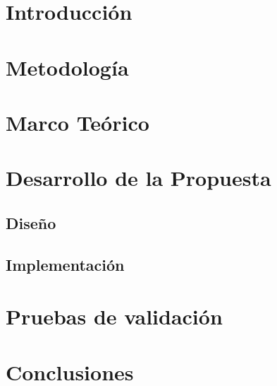 \documentclass[11pt,a4paper]{book}
\begin{document}
\tableofcontents

{\listoffigures \let\cleardoublepage\clearpage \listoftables}


\chapter{Introducción}


\chapter{Metodología}


\chapter{Marco Teórico}


\chapter{Desarrollo de la Propuesta}


%

\section{Diseño}


\section{Implementación}


\chapter{Pruebas de validación}


\chapter{Conclusiones}


\printbibliography[heading=bibnumbered,title=Referencias]

%
\end{document}
